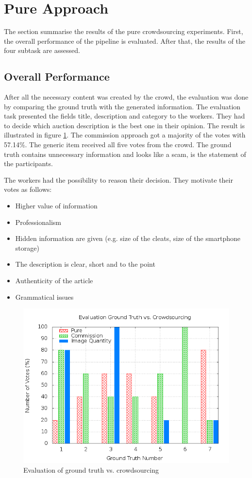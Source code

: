 \section{Pure Approach}
The section summarise the results of the pure crowdsourcing experiments. First, the overall performance of the pipeline is evaluated. After that, the results of the four subtask are assessed.
\subsection{Overall Performance}
After all the necessary content was created by the crowd, the evaluation was done by comparing the ground truth with the generated information. The evaluation task presented the fields title, description and category to the workers. They had to decide which auction description is the best one in their opinion. The result is illustrated in figure \ref{crowdsourcing_eval}. The commission approach got a majority of the votes with 57.14\%. The generic item received all five votes from the crowd. The ground truth contains unnecessary information and looks like a scam, is the statement of the participants.

The workers had the possibility to reason their decision. They motivate their votes as follows: 
\begin{itemize}
	\item Higher value of information 
	\item Professionalism 
	\item Hidden information are given (e.g. size of the cleats, size of the smartphone storage) 
	\item The description is clear, short and to the point 
	\item Authenticity of the article 
	\item Grammatical issues 
\end{itemize}
\begin{figure}
\centering
\includegraphics[scale=0.55]{images/plots/crowdsourcing/plot_evaluation_all.png}
\caption{Evaluation of ground truth vs. crowdsourcing}
\label{crowdsourcing_eval}
\end{figure}
